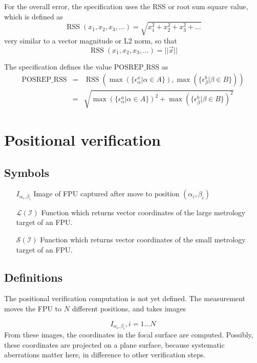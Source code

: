 \documentclass[11pt,a4paper]{scrartcl}
\DeclareMathOperator{\RSS}{RSS}
\begin{document}
For the overall error, the specification uses the RSS or root sum
square value, which is defined as
\[
\RSS(x_1, x_2, x_3, \ldots) = \sqrt{x_1^2 + x_2^2 + x_3^2 + \ldots}
\]
very similar to a vector magnitude or L2 norm, so that
\[
\RSS(x_1, x_2, x_3, \ldots) = ||\vec{x}||
\]

The specification defines the value $\mathrm{POSREP\_RSS}$ as
\begin{eqnarray}
  \mathrm{POSREP\_RSS} & = &  \RSS( \max(\{\epsilon^{a}_\alpha| \alpha \in A\}), \max(\{\epsilon^{b}_\beta| \beta \in B\}) ) \\
  & = & \sqrt{\max(\{\epsilon^{a}_\alpha| \alpha \in A\})^2 + \max(\{\epsilon^{b}_\beta| \beta \in B\})^2 }
\end{eqnarray}


\section{Positional verification}
\subsection{Symbols}
\begin{itemize}
  \item[]
\item[$I_{\alpha_i,\beta_i}$] Image of FPU captured after move to position $(\alpha_i,\beta_i)$
\item[$\mathcal{L(I)}$] Function which returns vector coordinates of
  the large metrology target of an FPU.
\item[$\mathcal{S(I)}$] Function which returns vector coordinates of
  the small metrology target of an FPU.

\end{itemize}

\subsection{Definitions}

The positional verification computation is not yet defined.
The measurement moves the FPU to $N$ different positions,
and takes images

\[
I_{\alpha_i,\beta_i}, i = 1 \ldots N
\]
From these images, the coordinates in the focal surface are computed.
Possibly, these coordinates are projected on a plane surface,
because systematic aberrations matter here, in difference
to other verification steps.
\end{document}
